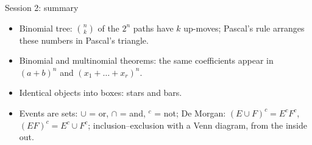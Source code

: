 \documentclass[aspectratio=169,11pt,usepdftitle=false]{beamer}
\begin{document}


\begin{frame}{Session 2: summary}
	\small
	\begin{itemize}
		\item Binomial tree: $\binom nk$ of the $2^n$ paths have $k$ up-moves;
		      Pascal's rule arranges these numbers in Pascal's triangle.
		\item Binomial and multinomial theorems: the same coefficients appear
		      in $(a+b)^n$ and $(x_1+\dots+x_r)^n$.
		\item Identical objects into boxes: stars and bars.
		\item Events are sets: $\cup$ = or, $\cap$ = and, $^c$ = not;
		      De Morgan: $(E\cup F)^c=E^cF^c$, $(EF)^c=E^c\cup F^c$;
		      inclusion--exclusion with a Venn diagram, from the inside out.
	\end{itemize}
\end{frame}
\end{document}
